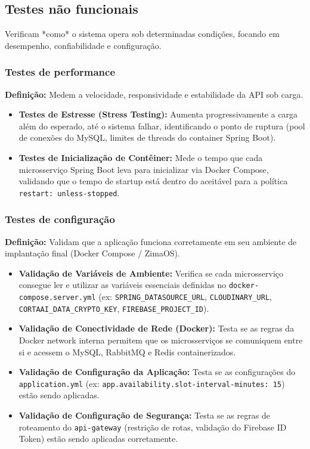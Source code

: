 \documentclass[
    12pt, 
    a4paper, 
    oneside, 
    chapter=TITLE, 
    section=TITLE
]{abntex2}
\begin{document}
\subsection{Testes não funcionais}
Verificam *como* o sistema opera sob determinadas condições, focando em desempenho, confiabilidade e configuração.

\subsubsection{Testes de performance}
\textbf{Definição:} Medem a velocidade, responsividade e estabilidade da API sob carga.
\begin{itemize}
    \item \textbf{Testes de Estresse (Stress Testing):} Aumenta progressivamente a carga além do esperado, até o sistema falhar, identificando o ponto de ruptura (pool de conexões do MySQL, limites de threads do container Spring Boot).
    \item \textbf{Testes de Inicialização de Contêiner:} Mede o tempo que cada microsserviço Spring Boot leva para inicializar via Docker Compose, validando que o tempo de startup está dentro do aceitável para a política \texttt{restart: unless-stopped}.
\end{itemize}

\subsubsection{Testes de configuração}
\textbf{Definição:} Validam que a aplicação funciona corretamente em seu ambiente de implantação final (Docker Compose / ZimaOS).
\begin{itemize}
    \item \textbf{Validação de Variáveis de Ambiente:} Verifica se cada microsserviço consegue ler e utilizar as variáveis essenciais definidas no \texttt{docker-compose.server.yml} (ex: \texttt{SPRING\_DATASOURCE\_URL}, \texttt{CLOUDINARY\_URL}, \texttt{CORTAAI\_DATA\_CRYPTO\_KEY}, \texttt{FIREBASE\_PROJECT\_ID}).
    \item \textbf{Validação de Conectividade de Rede (Docker):} Testa se as regras da Docker network interna permitem que os microsserviços se comuniquem entre si e acessem o MySQL, RabbitMQ e Redis containerizados.
    \item \textbf{Validação de Configuração da Aplicação:} Testa se as configurações do \texttt{application.yml} (ex: \texttt{app.availability.slot-interval-minutes: 15}) estão sendo aplicadas.
    \item \textbf{Validação de Configuração de Segurança:} Testa se as regras de roteamento do \texttt{api-gateway} (restrição de rotas, validação do Firebase ID Token) estão sendo aplicadas corretamente.
\end{itemize}
\end{document}
